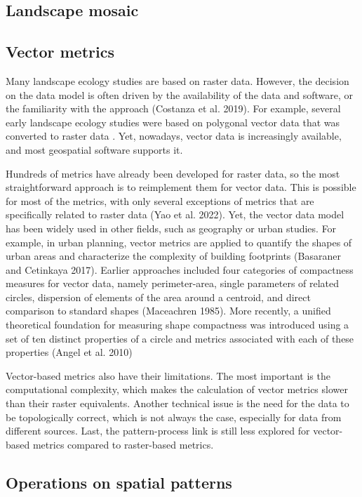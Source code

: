 \documentclass[
  12pt,
  a4paperpaper,
]{article}
\begin{document}
\subsection{Landscape mosaic}\label{landscape-mosaic}

\subsection{Vector metrics}\label{vector-metrics}

Many landscape ecology studies are based on raster data. However, the
decision on the data model is often driven by the availability of the
data and software, or the familiarity with the approach (Costanza et al.
2019). For example, several early landscape ecology studies were based
on polygonal vector data that was converted to raster data . Yet,
nowadays, vector data is increasingly available, and most geospatial
software supports it.

Hundreds of metrics have already been developed for raster data, so the
most straightforward approach is to reimplement them for vector data.
This is possible for most of the metrics, with only several exceptions
of metrics that are specifically related to raster data (Yao et al.
2022). Yet, the vector data model has been widely used in other fields,
such as geography or urban studies. For example, in urban planning,
vector metrics are applied to quantify the shapes of urban areas and
characterize the complexity of building footprints (Basaraner and
Cetinkaya 2017). Earlier approaches included four categories of
compactness measures for vector data, namely perimeter-area, single
parameters of related circles, dispersion of elements of the area around
a centroid, and direct comparison to standard shapes (Maceachren 1985).
More recently, a unified theoretical foundation for measuring shape
compactness was introduced using a set of ten distinct properties of a
circle and metrics associated with each of these properties (Angel et
al. 2010)

Vector-based metrics also have their limitations. The most important is
the computational complexity, which makes the calculation of vector
metrics slower than their raster equivalents. Another technical issue is
the need for the data to be topologically correct, which is not always
the case, especially for data from different sources. Last, the
pattern-process link is still less explored for vector-based metrics
compared to raster-based metrics.

\subsection{Operations on spatial
patterns}\label{operations-on-spatial-patterns}
\end{document}
